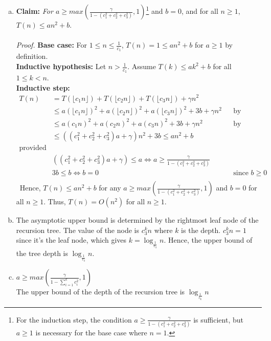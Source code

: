 \documentclass[11pt]{article}
\begin{document}



\begin{solution} 
\begin{enumerate}[(a)]
\item 
\textbf{Claim:} \emph{For $a\geq max(\frac{\gamma}{1-(c_{1}^{2}+c_{2}^{2}+c_{3}^{2})}, 1)$}\footnote{For the induction step, the condition $a \geq \frac{\gamma}{1-(c_{1}^{2}+c_{2}^{2}+c_{3}^{2})}$ is sufficient, but $a\geq 1$ is necessary for the base case where $n=1$.} and 
$b=0$, and for all $n\geq1$, \\$T(n)\leq an^{2}+b$.\\\\
\emph{Proof.} \textbf{Base case: } For $1\leq n\leq\frac{1}{c_{1}}$, $T(n)=1\leq an^{2}+b$ for $a\geq 1$ by definition.\\
\textbf{Inductive hypothesis: } Let $n > \frac{1}{c_{1}}$. Assume $T(k)\leq ak^{2}+b$ for all $1\leq k < n$.\\
\textbf{Inductive step: }
\begin{align*}
T(n)	&= T(\lfloor c_{1}n\rfloor) + T(\lfloor c_{2}n\rfloor) + T(\lfloor c_{3}n\rfloor) + \gamma n^{2}\\
	&\leq a(\lfloor c_{1}n\rfloor)^{2} + a(\lfloor c_{2}n\rfloor)^{2} + a(\lfloor c_{3}n\rfloor)^{2} + 3b + \gamma n^{2}  
		&& \text{by induction}\\
	&\leq a(c_{1}n)^{2} + a(c_{2}n)^{2} + a(c_{3}n)^{2} + 3b + \gamma n^{2}  
		&& \text{by definition of floor operation}\\
	&\leq ((c_{1}^{2}+c_{2}^{2}+c_{3}^{2})a + \gamma)n^{2} + 3b \leq an^{2} + b\\
\text{provided that} \\
	&((c_{1}^{2}+c_{2}^{2}+c_{3}^{2})a + \gamma) \leq a \iff 
		a\geq \frac{\gamma}{1-(c_{1}^{2}+c_{2}^{2}+c_{3}^{2})} \\
	& 3b \leq b \iff b = 0 && \text{since } b \geq 0 \\
\end{align*}\
Hence, $T(n) \leq an^{2} + b$ for any $a\geq max(\frac{\gamma}{1-(c_{1}^{2}+c_{2}^{2}+c_{3}^{2})}, 1)$ and 
$b=0$ for all $n\geq 1$. Thus, $T(n) = O(n^{2})$ for all $n \geq 1$.

\item The asymptotic upper bound is determined by the rightmost leaf node of the recursion tree. The value of the node is $c_{3}^{k}n$ where $k$ is the depth. $c_{3}^{k}n = 1$ since it's the leaf node, which gives $k = \log_{\frac{1}{c_{3}}}{n}$. Hence, the upper bound of the tree depth is $\log_{\frac{1}{c_{3}}}{n}$.

\item 
$a\geq max(\frac{\gamma}{1-\sum_{i=1}^{k}{c_{i}^{2}}}, 1)$ \\
The upper bound of the depth of the recursion tree is $\log_{\frac{1}{c_{k}}}{n}$

\end{enumerate}
\end{solution}
\end{document}
